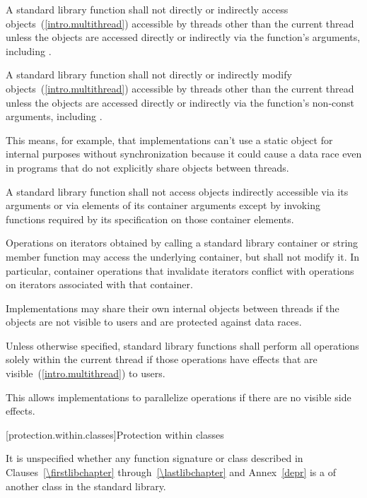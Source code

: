 \pnum
A \Cpp standard library function shall not directly or indirectly access
objects~(\ref{intro.multithread}) accessible by threads other than the current thread
unless the objects are accessed directly or indirectly via the function's arguments,
including .

\pnum
A \Cpp standard library function shall not directly or indirectly modify
objects~(\ref{intro.multithread}) accessible by threads other than the current thread
unless the objects are accessed directly or indirectly via the function's non-const
arguments, including .

\pnum
\enternote This means, for example, that implementations can't use a static object for
internal purposes without synchronization because it could cause a data race even in
programs that do not explicitly share objects between threads. \exitnote

\pnum
A \Cpp standard library function shall not access objects indirectly accessible via its
arguments or via elements of its container arguments except by invoking functions
required by its specification on those container elements.

\pnum
Operations on iterators obtained by calling a standard library container or string
member function may access the underlying container, but shall not modify it.
\enternote In particular, container operations that invalidate iterators conflict
with operations on iterators associated with that container. \exitnote

\pnum
Implementations may share their own internal objects between threads if the objects are
not visible to users and are protected against data races.

\pnum
Unless otherwise specified, \Cpp standard library functions shall perform all operations
solely within the current thread if those operations have effects that are
visible~(\ref{intro.multithread}) to users.

\pnum
\enternote This allows implementations to parallelize operations if there are no visible
%
side effects. \exitnote

[protection.within.classes]{Protection within classes}

\pnum
{}%
It is unspecified whether any function signature or class described in
Clauses~\ref{\firstlibchapter} through~\ref{\lastlibchapter} and Annex~\ref{depr} is a
of another class in the \Cpp standard library.

